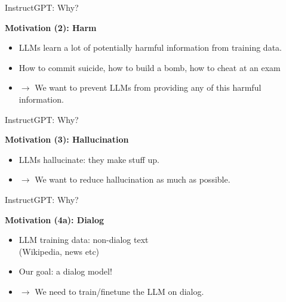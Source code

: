 \begin{vbframe}{InstructGPT: Why?}

\vfill

\textbf{Motivation (2): Harm}

	\begin{itemize}
		\item LLMs learn a lot of potentially
		harmful information from training data.
		\item How to commit suicide, how to build a
		bomb, how to cheat at an exam
		\item $\rightarrow$ We want to prevent LLMs
		from providing any of this harmful information.
	\end{itemize}

\vfill

\end{vbframe}




\begin{vbframe}{InstructGPT: Why?}

\vfill

\textbf{Motivation (3): Hallucination}

	\begin{itemize}
		\item LLMs hallucinate: they make stuff up.
		\item $\rightarrow$ We want to reduce
                hallucination as much as possible.
	\end{itemize}

\vfill

\end{vbframe}

\begin{vbframe}{InstructGPT: Why?}

\vfill

\textbf{Motivation (4a): Dialog}

	\begin{itemize}
		\item LLM training data: non-dialog text\\
                (Wikipedia, news etc)
		\item Our goal: a dialog model!
		\item $\rightarrow$ We need to train/finetune the LLM on dialog.
	\end{itemize}

\vfill

\end{vbframe}




